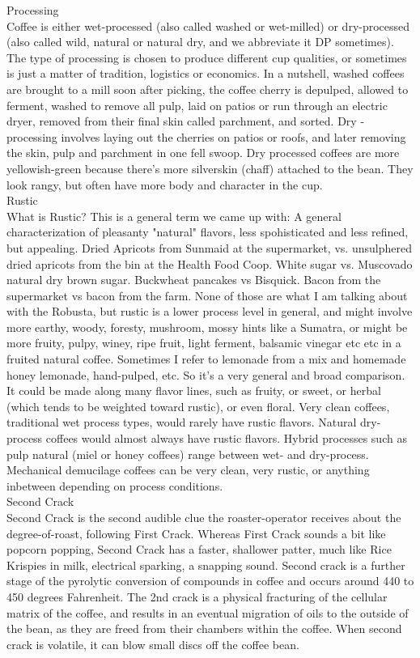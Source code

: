 \documentclass[10pt,twoside,footinclude=true,headinclude=true]{scrbook} %
\begin{document}
\begin{multicols}{2}
\medskip
{\smallcaps \small Processing}\\
Coffee is either wet-processed (also called washed or wet-milled) or dry-processed (also called wild, natural or natural dry, and we abbreviate it DP sometimes). The type of processing is chosen to produce different cup qualities, or sometimes is just a matter of tradition, logistics or economics. In a nutshell, washed coffees are brought to a mill soon after picking, the coffee cherry is depulped, allowed to ferment, washed to remove all pulp, laid on patios or run through an electric dryer, removed from their final skin called parchment, and sorted. Dry -processing involves laying out the cherries on patios or roofs, and later removing the skin, pulp and parchment in one fell swoop. Dry processed coffees are more yellowish-green because there's more silverskin (chaff) attached to the bean. They look rangy, but often have more body and character in the cup.\\
\medskip
{\smallcaps \small Rustic}\\
What is Rustic? This is a general term we came up with: A general characterization of pleasanty "natural" flavors, less spohisticated and less refined, but appealing. Dried Apricots from Sunmaid at the supermarket, vs. unsulphered dried apricots from the bin at the Health Food Coop. White sugar vs. Muscovado natural dry brown sugar. Buckwheat pancakes vs Bisquick. Bacon from the supermarket vs bacon from the farm. None of those are what I am talking about with the Robusta, but rustic is a lower process level in general, and might involve more earthy, woody, foresty, mushroom, mossy hints like a Sumatra, or might be more fruity, pulpy, winey, ripe fruit, light ferment, balsamic vinegar etc etc in a fruited natural coffee. Sometimes I refer to lemonade from a mix and homemade honey lemonade, hand-pulped, etc. So it's a very general and broad comparison. It could be made along many flavor lines, such as fruity, or sweet, or herbal (which tends to be weighted toward rustic), or even floral. Very clean coffees, traditional wet process types, would rarely have rustic flavors. Natural dry-process coffees would almost always have rustic flavors. Hybrid processes such as pulp natural (miel or honey coffees) range between wet- and dry-process. Mechanical demucilage coffees can be very clean, very rustic, or anything inbetween depending on process conditions.\\
\medskip
{\smallcaps \small Second Crack}\\
Second Crack is the second audible clue the roaster-operator receives about the degree-of-roast, following First Crack. Whereas First Crack sounds a bit like popcorn popping, Second Crack has a faster, shallower patter, much like Rice Krispies in milk, electrical sparking, a snapping sound. Second crack is a further stage of the pyrolytic conversion of compounds in coffee and occurs around 440 to 450 degrees Fahrenheit. The 2nd crack is a physical fracturing of the cellular matrix of the coffee, and results in an eventual migration of oils to the outside of the bean, as they are freed from their chambers within the coffee. When second crack is volatile, it can blow small discs off the coffee bean.\\

\end{multicols}
\end{document}
